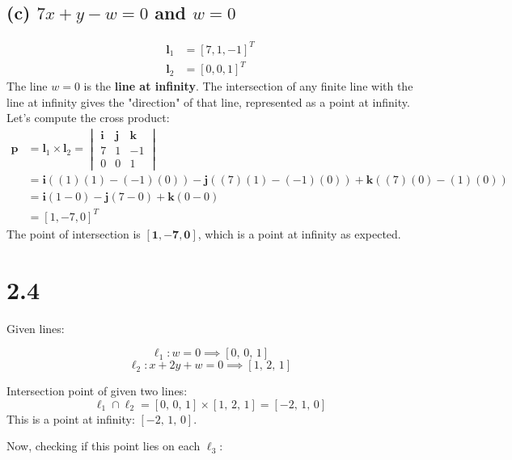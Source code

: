 \documentclass[12pt]{article}
\begin{document}
\subsection*{(c) $7x + y - w = 0$ and $w = 0$}

\begin{align*}
    \mathbf{l}_1 &= [7, 1, -1]^T \\
    \mathbf{l}_2 &= [0, 0, 1]^T
\end{align*}
The line $w=0$ is the \textbf{line at infinity}. The intersection of any finite line with the line at infinity gives the "direction" of that line, represented as a point at infinity.
Let's compute the cross product:
\begin{align*}
    \mathbf{p} &= \mathbf{l}_1 \times \mathbf{l}_2 = 
    \begin{vmatrix}
        \mathbf{i} & \mathbf{j} & \mathbf{k} \\
        7 & 1 & -1 \\
        0 & 0 & 1
    \end{vmatrix} \\
    &= \mathbf{i}((1)(1) - (-1)(0)) - \mathbf{j}((7)(1) - (-1)(0)) + \mathbf{k}((7)(0) - (1)(0)) \\
    &= \mathbf{i}(1 - 0) - \mathbf{j}(7 - 0) + \mathbf{k}(0 - 0) \\
    &= [1, -7, 0]^T
\end{align*}
The point of intersection is $\mathbf{[1, -7, 0]}$, which is a point at infinity as expected.

\section*{2.4}
Given lines:

\[
\ell_1: w = 0 \implies [0,\, 0,\, 1]
\]
\[
\ell_2: x + 2y + w = 0 \implies [1,\, 2,\, 1]
\]

Intersection point of given two lines:
\[
\ell_1 \cap \ell_2 = [0,\, 0,\, 1] \times [1,\, 2,\, 1] = [-2,\, 1,\, 0]
\]
This is a point at infinity: $[-2,\, 1,\, 0]$.

Now, checking if this point lies on each $\ell_3$:
\end{document}
